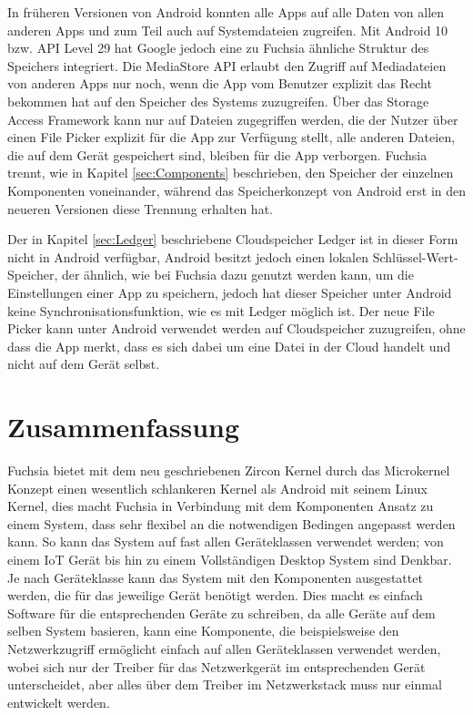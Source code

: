 \documentclass[a4paper]{scrartcl}
\begin{document}
In früheren Versionen von Android konnten alle Apps auf alle Daten von allen anderen Apps und zum Teil auch auf Systemdateien zugreifen. Mit  Android 10 bzw. API Level 29 hat Google jedoch eine zu Fuchsia ähnliche Struktur des Speichers integriert. Die MediaStore API erlaubt den Zugriff auf Mediadateien von anderen Apps nur noch, wenn die App vom Benutzer explizit das Recht bekommen hat auf den Speicher des Systems zuzugreifen. Über das Storage Access Framework kann nur auf Dateien zugegriffen werden, die der Nutzer über einen File Picker explizit für die App zur Verfügung stellt, alle anderen Dateien, die auf dem Gerät gespeichert sind, bleiben für die App verborgen. Fuchsia trennt, wie in Kapitel \ref{sec:Components} beschrieben, den Speicher der einzelnen Komponenten voneinander, während das Speicherkonzept von Android erst in den neueren Versionen diese Trennung erhalten hat. \cite{Android.Storage.Overview}

Der in Kapitel \ref{sec:Ledger} beschriebene Cloudspeicher Ledger ist in dieser Form nicht in Android verfügbar, Android besitzt jedoch einen lokalen Schlüssel-Wert-Speicher, der ähnlich, wie bei Fuchsia dazu genutzt werden kann, um die Einstellungen einer App zu speichern, jedoch hat dieser Speicher unter Android keine Synchronisationsfunktion, wie es mit Ledger möglich ist. \cite{Android.Storage.Overview} Der neue File Picker kann unter Android verwendet werden auf Cloudspeicher zuzugreifen, ohne dass die App merkt, dass es sich dabei um eine Datei in der Cloud handelt und nicht auf dem Gerät selbst. \cite{Android.Storage.DocumentProvider}

\section{Zusammenfassung}
Fuchsia bietet mit dem neu geschriebenen Zircon Kernel durch das Microkernel Konzept einen wesentlich schlankeren Kernel als Android mit seinem Linux Kernel, dies macht Fuchsia in Verbindung mit dem Komponenten Ansatz zu einem System, dass sehr flexibel an die notwendigen Bedingen angepasst werden kann. So kann das System auf fast allen Geräteklassen verwendet werden; von einem IoT Gerät bis hin zu einem Vollständigen Desktop System sind Denkbar. Je nach Geräteklasse kann das System mit den Komponenten ausgestattet werden, die für das jeweilige Gerät benötigt werden. Dies macht es einfach Software für die entsprechenden Geräte zu schreiben, da alle Geräte auf dem selben System basieren, kann eine Komponente, die beispielsweise den Netzwerkzugriff ermöglicht einfach auf allen Geräteklassen verwendet werden, wobei sich nur der Treiber für das Netzwerkgerät im entsprechenden Gerät unterscheidet, aber alles über dem Treiber im Netzwerkstack muss nur einmal entwickelt werden.
\end{document}
